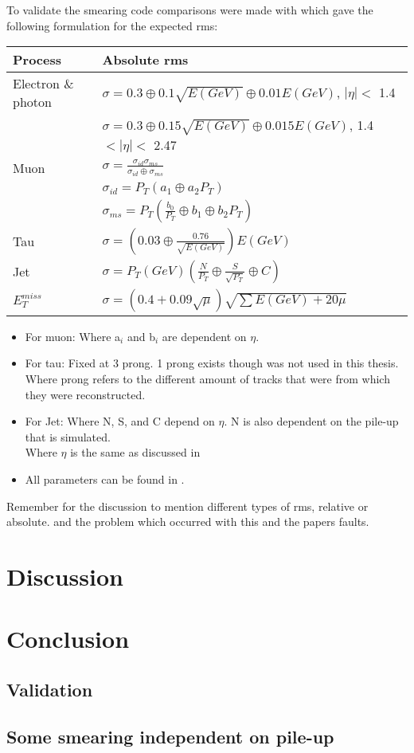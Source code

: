 To validate the smearing code comparisons were made with \citep{ATL-PHYS-PUB-2013-004} which gave the following formulation for the expected rms: 
\begin{table}[h]
\renewcommand{\arraystretch}{1.5} %
\begin{tabular}{|l|l|}
\hline
Process & Absolute rms \\ \hline
Electron \& photon & $\sigma=0.3\oplus 0.1\sqrt{E(GeV)}\oplus 0.01E(GeV)$, $|\eta|<$ 1.4 \\
& $\sigma=0.3\oplus 0.15\sqrt{E(GeV)}\oplus 0.015E(GeV)$, 1.4 $<|\eta|<$ 2.47 \\ \hline 
Muon & $\sigma=\frac{\sigma_{id} \sigma_{ms}}{\sigma_{id} \oplus \sigma_{ms}}$\\
& $\sigma_{id}=P_T(a_1 \oplus a_2 P_T)$\\
& $\sigma_{ms}=P_T(\frac{b_0}{P_T} \oplus b_1 \oplus b_2 P_T)$\\ \hline
Tau & $\sigma =(0.03\oplus \frac{0.76}{\sqrt{E(GeV)}})E(GeV)$ \\ \hline
Jet & $\sigma = P_T(GeV)(\frac{N}{P_T} \oplus \frac{S}{\sqrt{P_T}} \oplus C)$ \\ \hline
$E_T^{miss}$ & $\sigma = (0.4+0.09\sqrt{\mu})\sqrt{\sum E(GeV)+20\mu}$ \\ \hline
\end{tabular}
\renewcommand{\arraystretch}{1.0} %
\end{table}
\begin{itemize}
\item For muon: Where a$_i$ and b$_i$ are dependent on $\eta$.
\item For tau: Fixed at 3 prong. 1 prong exists though was not used in this thesis. \\
Where prong refers to the different amount of tracks that were from which they were reconstructed.
\item For Jet: Where N, S, and C depend on $\eta$. N is also dependent on the pile-up that is simulated.\\
Where $\eta$ is the same as discussed in 
\item All parameters can be found in \citep{ATL-PHYS-PUB-2013-004}.
\end{itemize}

Remember for the discussion to mention different types of rms, relative or absolute. and the problem which occurred with this and the papers faults.

\section{Discussion}
\section{Conclusion}
\subsection{Validation}
\subsection{Some smearing independent on pile-up}
